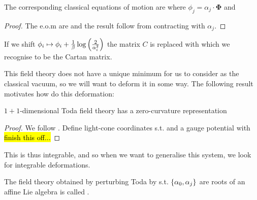 \documentclass{article}
\begin{document}
\begin{prop}
	The corresponding classical equations of motion are 
where $\phi_j = \alpha_j \cdot \bm{\Phi}$ and 
\end{prop}
\begin{proof}
	The e.o.m are 
and the result follow from contracting with $\alpha_j$.
\end{proof}

\begin{remark}
	If we shift $\phi_i \mapsto \phi_i + \frac{1}{\beta}\log \left( \frac{2}{\alpha_i^2} \right)$ the matrix $C$ is replaced with 
which we recognise to be the Cartan matrix. 
\end{remark}

This field theory does not have a unique minimum for us to consider as the classical vacuum, so we will want to deform it in some way. The following result motivates how do this deformation:

\begin{prop}
	$1+1$-dimensional Toda field theory has a zero-curvature representation 
\end{prop}
\begin{proof}
	We follow \cite{Olive1983}. Define light-cone coordinates
s.t. 
and a gauge potential with 
\hl{finish this off...}
\end{proof}

This is thus integrable, and so when we want to generalise this system, we look for integrable deformations. 

\begin{definition}
	The field theory obtained by perturbing Toda by 
s.t. $\left\{ \alpha_0, \alpha_j \right\}$ are roots of an affine Lie algebra is called . 
\end{definition}
\end{document}
